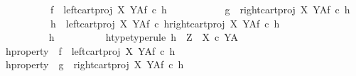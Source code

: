 \begin{isabellebody}
\ \ \ \ \ \ \ \ \ \ f\ {\isacharequal}{\kern0pt}\ left{\isacharunderscore}{\kern0pt}cart{\isacharunderscore}{\kern0pt}proj\ X\ Y\isactrlbsup A\isactrlesup \isactrlsub f\ {\isasymcirc}\isactrlsub c\ h{}\ {\isasymLongrightarrow}\isanewline
\ \ \ \ \ \ \ \ \ \ g\ {\isacharequal}{\kern0pt}\ right{\isacharunderscore}{\kern0pt}cart{\isacharunderscore}{\kern0pt}proj\ X\ Y\isactrlbsup A\isactrlesup \isactrlsub f\ {\isasymcirc}\isactrlsub c\ h{}\ {\isasymLongrightarrow}\isanewline
\ \ \ \ \ \ \ \ \ \ h{}\ {\isacharequal}{\kern0pt}\ {\isasymlangle}{\isacharparenleft}{\kern0pt}left{\isacharunderscore}{\kern0pt}cart{\isacharunderscore}{\kern0pt}proj\ X\ Y\isactrlbsup A\isactrlesup \isactrlsub f\ {\isasymcirc}\isactrlsub c\ h{}{\isacharparenright}{\kern0pt}\isactrlsup {\isasymflat}{\isacharcomma}{\kern0pt}{\isacharparenleft}{\kern0pt}right{\isacharunderscore}{\kern0pt}cart{\isacharunderscore}{\kern0pt}proj\ X\ Y\isactrlbsup A\isactrlesup \isactrlsub f\ {\isasymcirc}\isactrlsub c\ h{}{\isacharparenright}{\kern0pt}\isactrlsup {\isasymflat}{\isasymrangle}\isactrlsup {\isasymsharp}{\isachardoublequoteclose}\isanewline
\ \ \ \ \ \ \isamarkupfalse%
\ {\isacharminus}{\kern0pt}\isanewline
\ \ \ \ \ \ \ \ \isamarkupfalse%
\ h\isanewline
\ \ \ \ \ \ \ \ \isamarkupfalse%
\ h{\isacharunderscore}{\kern0pt}type{\isacharbrackleft}{\kern0pt}type{\isacharunderscore}{\kern0pt}rule{\isacharbrackright}{\kern0pt}{\isacharcolon}{\kern0pt}\ {\isachardoublequoteopen}h\ {\isacharcolon}{\kern0pt}\ Z\ {\isasymrightarrow}\ {\isacharparenleft}{\kern0pt}X\ {\isasymtimes}\isactrlsub c\ Y{\isacharparenright}{\kern0pt}\isactrlbsup A\isactrlesup {\isachardoublequoteclose}\isanewline
\ \ \ \ \ \ \ \ \isamarkupfalse%
\ h{\isacharunderscore}{\kern0pt}property{}{\isacharcolon}{\kern0pt}\ \ {\isachardoublequoteopen}f\ {\isacharequal}{\kern0pt}\ {\isacharparenleft}{\kern0pt}{\isacharparenleft}{\kern0pt}left{\isacharunderscore}{\kern0pt}cart{\isacharunderscore}{\kern0pt}proj\ X\ Y{\isacharparenright}{\kern0pt}\isactrlbsup A\isactrlesup \isactrlsub f{\isacharparenright}{\kern0pt}\ {\isasymcirc}\isactrlsub c\ h{\isachardoublequoteclose}\isanewline
\ \ \ \ \ \ \ \ \isamarkupfalse%
\ h{\isacharunderscore}{\kern0pt}property{}{\isacharcolon}{\kern0pt}\ \ {\isachardoublequoteopen}g\ {\isacharequal}{\kern0pt}\ {\isacharparenleft}{\kern0pt}{\isacharparenleft}{\kern0pt}right{\isacharunderscore}{\kern0pt}cart{\isacharunderscore}{\kern0pt}proj\ X\ Y{\isacharparenright}{\kern0pt}\isactrlbsup A\isactrlesup \isactrlsub f{\isacharparenright}{\kern0pt}\ {\isasymcirc}\isactrlsub c\ h{\isachardoublequoteclose}\isanewline

\end{isabellebody}
